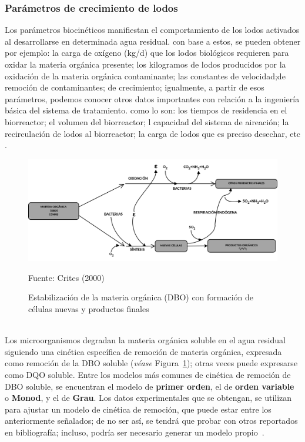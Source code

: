 \subsubsection*{Parámetros de crecimiento de lodos}
Los parámetros biocinéticos manifiestan el comportamiento de los lodos activados al desarrollarse en determinada agua residual. con base a estos, se pueden obtener por ejemplo: la carga de oxígeno (kg/d) que los lodos biológicos requieren para oxidar la materia orgánica presente; los kilogramos de lodos producidos por la oxidación de la materia orgánica contaminante; las constantes de velocidad;de remoción de contaminantes; de crecimiento; igualmente, a partir de esos parámetros, podemos conocer otros datos importantes con relación a la ingeniería básica del sistema de tratamiento. como lo son: los tiempos de residencia en el biorreactor; el volumen del biorreactor; l capacidad del sistema de aireación; la recirculación de lodos al biorreactor; la carga de lodos que es preciso desechar, etc \citep{martinez2005}.
	\begin{figure}[!h]
		\begin{center}
		\includegraphics[scale=0.32]{Estabilizacion_mat_org.png}
		\caption{Estabilización de la materia orgánica (DBO) con formación de células nuevas y productos finales}
		\small{Fuente: Crites (2000)}
		\label{fig:estabilizacion}
		\end{center}
	\end{figure}
\\Los microorganismos degradan la materia orgánica soluble en el agua residual siguiendo una cinética específica de remoción de materia orgánica, expresada como remoción de la DBO soluble (\emph{véase} Figura~\ref{fig:estabilizacion}); otras veces puede expresarse como DQO soluble. Entre los modelos más comunes de cinética de remoción de DBO soluble, se encuentran el modelo de \textbf{primer orden}, el de \textbf{orden variable} o \textbf{Monod}, y el de \textbf{Grau}. Los datos experimentales que se obtengan, se utilizan para ajustar un modelo de cinética de remoción, que puede estar entre los anteriormente señalados; de no ser así, se tendrá que probar con otros reportados en bibliografía; incluso, podría ser necesario generar un modelo propio~\citep{martinez2005}.\\
